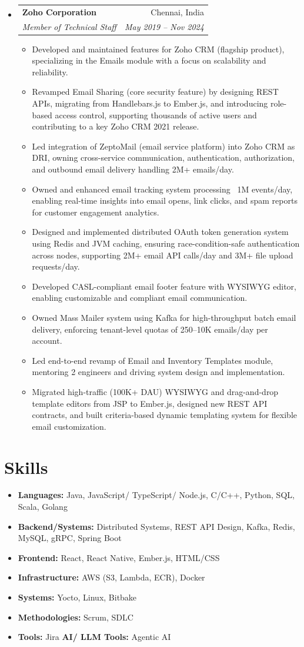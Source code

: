 \documentclass[a4paper,20pt]{article}
\makeatletter
\newcommand{\resumeSubheading}[4]{
  \vspace{-2pt}\item
    \begin{tabular*}{0.97\textwidth}{l@{\extracolsep{\fill}}r}
      \textbf{#1} & #2 \\
      \textit{#3} & \textit{#4} \\
    \end{tabular*}\vspace{-6pt}
}
\newcommand{\resumeItem}[1]{
  \item \small{#1 \vspace{-2pt}}
}
\makeatother
\begin{document}
\begin{itemize}[leftmargin=*]
\resumeSubheading
{Zoho Corporation}{Chennai, India}
{Member of Technical Staff}{May 2019 – Nov 2024}
\begin{itemize}
\resumeItem{Developed and maintained features for Zoho CRM (flagship product), specializing in the Emails module with a focus on scalability and reliability.}
\resumeItem{Revamped Email Sharing (core security feature) by designing REST APIs, migrating from Handlebars.js to Ember.js, and introducing role-based access control, supporting thousands of active users and contributing to a key Zoho CRM 2021 release.}
\resumeItem{Led integration of ZeptoMail (email service platform) into Zoho CRM as DRI, owning cross-service communication, authentication, authorization, and outbound email delivery handling 2M+ emails/day.}
\resumeItem{Owned and enhanced email tracking system processing ~1M events/day, enabling real-time insights into email opens, link clicks, and spam reports for customer engagement analytics.}
\resumeItem{Designed and implemented distributed OAuth token generation system using Redis and JVM caching, ensuring race-condition-safe authentication across nodes, supporting 2M+ email API calls/day and 3M+ file upload requests/day.}
\resumeItem{Developed CASL-compliant email footer feature with WYSIWYG editor, enabling customizable and compliant email communication.}
\resumeItem{Owned Mass Mailer system using Kafka for high-throughput batch email delivery, enforcing tenant-level quotas of 250–10K emails/day per account.}
\resumeItem{Led end-to-end revamp of Email and Inventory Templates module, mentoring 2 engineers and driving system design and implementation.}
\resumeItem{Migrated high-traffic (100K+ DAU) WYSIWYG and drag-and-drop template editors from JSP to Ember.js, designed new REST API contracts, and built criteria-based dynamic templating system for flexible email customization.}
\end{itemize}

\end{itemize}

\section{Skills}
\begin{itemize}[leftmargin=*]
\item \textbf{Languages:} Java, JavaScript/ TypeScript/ Node.js, C/C++, Python, SQL, Scala, Golang
\item \textbf{Backend/Systems:} Distributed Systems, REST API Design, Kafka, Redis, MySQL, gRPC, Spring Boot
\item \textbf{Frontend:} React, React Native, Ember.js, HTML/CSS
\item \textbf{Infrastructure:} AWS (S3, Lambda, ECR), Docker
\item \textbf{Systems:} Yocto, Linux, Bitbake
\item \textbf{Methodologies:} Scrum, SDLC 
\item \textbf{Tools:} Jira \textbf{AI/ LLM Tools:} Agentic AI 
\end{itemize}
\end{document}
